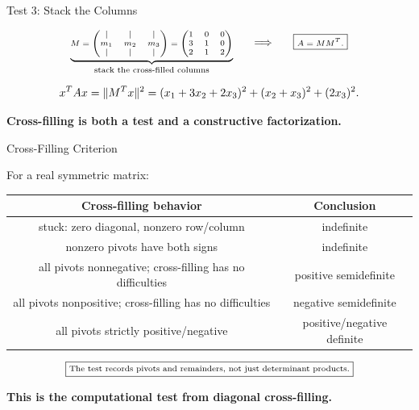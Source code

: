 \documentclass[10pt]{beamer}
\theoremstyle{definition}
\newcommand{\x}[1]{\alert{\textbf{#1}}}
\begin{document}
\begin{frame}[shrink=8]{Test 3: Stack the Columns}

\[
\scriptsize
\underbrace{
M=
\begin{pmatrix}
|&|&|\\
m_1&m_2&m_3\\
|&|&|
\end{pmatrix}
=
\begin{pmatrix}
1&0&0\\
3&1&0\\
2&1&2
\end{pmatrix}}_{\text{stack the cross-filled columns}}
\qquad\Longrightarrow\qquad
\boxed{A=MM^T.}
\]

\vfill

\[
\scriptsize
x^TAx
=\|M^Tx\|^2
=(x_1+3x_2+2x_3)^2+(x_2+x_3)^2+(2x_3)^2.
\]

\vfill

\begin{center}
\x{Cross-filling is both a test and a constructive factorization.}
\end{center}

\end{frame}


\begin{frame}[shrink=6]{Cross-Filling Criterion}

For a real symmetric matrix:

\vfill

\begin{center}
\small
\renewcommand{\arraystretch}{1.25}
\begin{tabular}{c|c}
\textbf{Cross-filling behavior} & \textbf{Conclusion}\\
\hline
stuck: zero diagonal, nonzero row/column & indefinite\\
nonzero pivots have both signs & indefinite\\
all pivots nonnegative; cross-filling has no difficulties & positive semidefinite\\
all pivots nonpositive; cross-filling has no difficulties & negative semidefinite\\
all pivots strictly positive/negative & positive/negative definite
\end{tabular}
\end{center}

\vfill

\[
\scriptsize
\boxed{
\text{The test records pivots and remainders, not just determinant products.}
}
\]

\vfill

\begin{center}
\x{This is the computational test from diagonal cross-filling.}
\end{center}

\end{frame}
\end{document}
